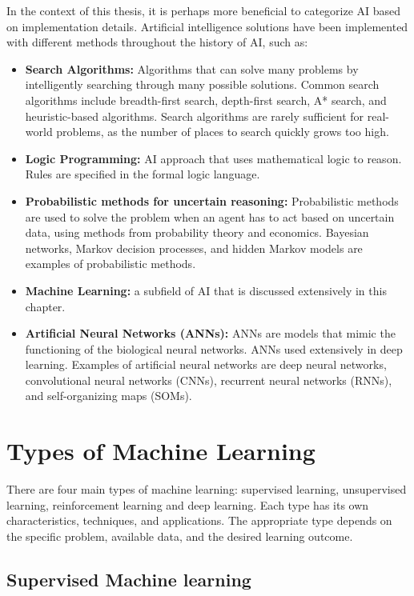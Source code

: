 In the context of this thesis, it is perhaps more beneficial to categorize AI based on implementation details. Artificial intelligence solutions have been implemented with different methods throughout the history of AI\cite{russell2010artificial}, such as:

\begin{itemize}
  \item \textbf{Search Algorithms:} Algorithms that can solve many problems by intelligently searching through many possible solutions. Common search algorithms include breadth-first search, depth-first search, A* search, and heuristic-based algorithms. Search algorithms are rarely sufficient for real-world problems, as the number of places to search quickly grows too high.
  \item \textbf{Logic Programming:} AI approach that uses mathematical logic to reason. Rules are specified in the formal logic language.
  \item \textbf{Probabilistic methods for uncertain reasoning:} Probabilistic methods are used to solve the problem when an agent has to act based on uncertain data, using methods from probability theory and economics. Bayesian networks, Markov decision processes, and hidden Markov models are examples of probabilistic methods.
  \item \textbf{Machine Learning:} a subfield of AI that is discussed extensively in this chapter.
  \item \textbf{Artificial Neural Networks (ANNs):} ANNs are models that mimic the functioning of the biological neural networks. ANNs used extensively in deep learning. Examples of artificial neural networks are deep neural networks, convolutional neural networks (CNNs), recurrent neural networks (RNNs), and self-organizing maps (SOMs).
\end{itemize}

\section{Types of Machine Learning} \label{mltypes}

There are four main types of machine learning: supervised learning, unsupervised learning, reinforcement learning and deep learning. Each type has its own characteristics, techniques, and applications. The appropriate type depends on the specific problem, available data, and the desired learning outcome.\cite{burkov2019hundred} 

\subsection{Supervised Machine learning} \label{sml}

